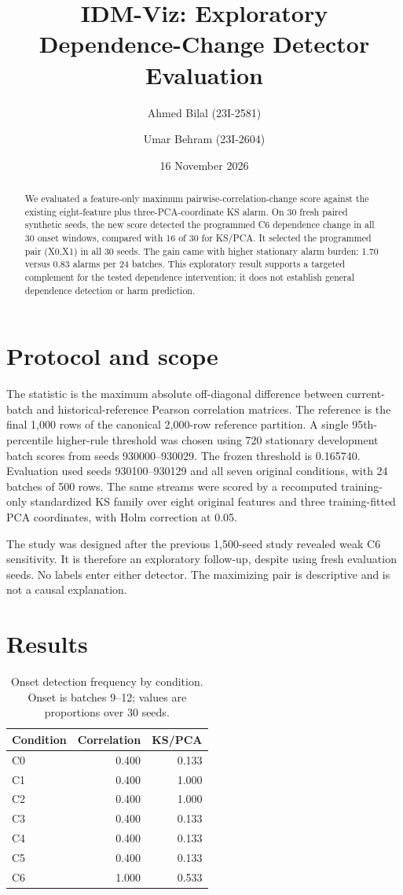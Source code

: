 \documentclass[10pt,a4paper]{article}
\title{IDM-Viz: Exploratory Dependence-Change Detector Evaluation}
\author{Ahmed Bilal (23I-2581) \and Umar Behram (23I-2604)}
\date{16 November 2026}
\begin{document}
\maketitle
\begin{abstract}
We evaluated a feature-only maximum pairwise-correlation-change score against the existing eight-feature plus three-PCA-coordinate KS alarm. On 30 fresh paired synthetic seeds, the new score detected the programmed C6 dependence change in all 30 onset windows, compared with 16 of 30 for KS/PCA. It selected the programmed pair (X0,X1) in all 30 seeds. The gain came with higher stationary alarm burden: 1.70 versus 0.83 alarms per 24 batches. This exploratory result supports a targeted complement for the tested dependence intervention; it does not establish general dependence detection or harm prediction.
\end{abstract}
\section{Protocol and scope}
The statistic is the maximum absolute off-diagonal difference between current-batch and historical-reference Pearson correlation matrices. The reference is the final 1,000 rows of the canonical 2,000-row reference partition. A single 95th-percentile higher-rule threshold was chosen using 720 stationary development batch scores from seeds 930000--930029. The frozen threshold is 0.165740. Evaluation used seeds 930100--930129 and all seven original conditions, with 24 batches of 500 rows. The same streams were scored by a recomputed training-only standardized KS family over eight original features and three training-fitted PCA coordinates, with Holm correction at 0.05.

The study was designed after the previous 1,500-seed study revealed weak C6 sensitivity. It is therefore an exploratory follow-up, despite using fresh evaluation seeds. No labels enter either detector. The maximizing pair is descriptive and is not a causal explanation.
\section{Results}
\begin{table}[ht]\centering\small
\caption{Onset detection frequency by condition. Onset is batches 9--12; values are proportions over 30 seeds.}
\begin{tabular}{lrr}\toprule Condition & Correlation & KS/PCA \\\midrule
C0 & 0.400 & 0.133 \tabularnewline
C1 & 0.400 & 1.000 \tabularnewline
C2 & 0.400 & 1.000 \tabularnewline
C3 & 0.400 & 0.133 \tabularnewline
C4 & 0.400 & 0.133 \tabularnewline
C5 & 0.400 & 0.133 \tabularnewline
C6 & 1.000 & 0.533 \tabularnewline
\bottomrule\end{tabular}\end{table}
\end{document}
